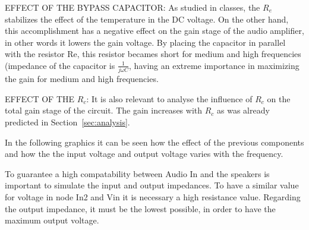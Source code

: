 \par EFFECT OF THE BYPASS CAPACITOR: As studied in classes, the $R_e$ stabilizes the effect of the temperature in the DC voltage. On the other hand, this accomplishment has a negative effect on the gain stage of the audio amplifier, in other words it lowers the gain voltage. By placing the capacitor in parallel with the resistor Re, this resistor becames short for medium and high frequencies (impedance of the capacitor is $\frac{1}{j\omega C}$, having an extreme importance in maximizing the gain for medium and high frequencies.

\par EFFECT OF THE $R_c$: It is also relevant to analyse the influence of $R_c$ on the total gain stage of the circuit. The gain increases with $R_c$ as was already predicted in Section~\ref{sec:analysis}.

\par In the following graphics it can be seen how the effect of the previous components and how the the input voltage and output voltage varies with the frequency.


\par To guarantee a high compatability between Audio In and the speakers is important to simulate the input and output impedances. To have a similar value for voltage in node In2 and Vin it is necessary a high resistance value. Regarding the output impedance, it must be the lowest possible, in order to have the maximum output voltage.
